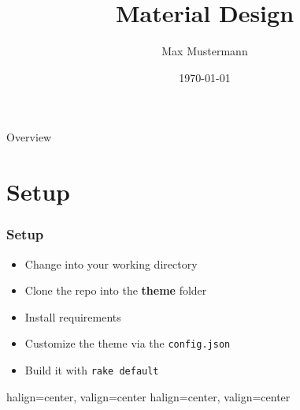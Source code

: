\documentclass{beamer}
\title{Material Design}
\date{\today}
\author{Max Mustermann}
\begin{document}

\begin{frame}
	\titlepage
\end{frame}

{
	\begin{frame}{Overview}
		\tableofcontents
	\end{frame}
}

\section{Setup}
\begin{frame}
	\frametitle{Setup}
	\begin{itemize}
		\item Change into your working directory
		\item Clone the repo into the \textbf{theme} folder
		\item Install requirements
		\item Customize the theme via the \texttt{config.json}
		\item Build it with \texttt{rake default}
	\end{itemize}
\end{frame}
\begin{frame}[fragile]
	{halign=center, valign=center}
	{halign=center, valign=center}
\end{frame}
\end{document}
